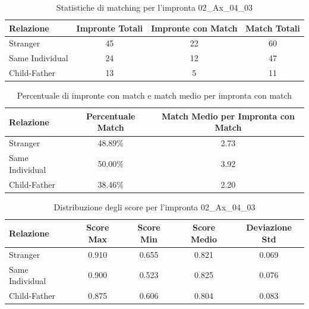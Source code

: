 \begin{table}[htbp]
\centering
\caption{Statistiche di matching per l'impronta 02\_Ax\_04\_03}
\label{tab:results_02_Ax_04_03}
\begin{tabular}{|l|c|c|c|}
\hline
\textbf{Relazione} & \textbf{Impronte Totali} & \textbf{Impronte con Match} & \textbf{Match Totali} \\
\hline
Stranger & 45 & 22 & 60 \\
\hline
Same Individual & 24 & 12 & 47 \\
\hline
Child-Father & 13 & 5 & 11 \\
\hline
\end{tabular}
\end{table}


\begin{table}[htbp]
\centering
\caption{Percentuale di impronte con match e match medio per impronta con match}
\label{tab:match_percentage_02_Ax_04_03}
\begin{tabular}{|l|c|c|}
\hline
\textbf{Relazione} & \textbf{Percentuale Match} & \textbf{Match Medio per Impronta con Match} \\
\hline
Stranger & 48.89\% & 2.73 \\
\hline
Same Individual & 50.00\% & 3.92 \\
\hline
Child-Father & 38.46\% & 2.20 \\
\hline
\end{tabular}
\end{table}


\begin{table}[htbp]
\centering
\caption{Distribuzione degli score per l'impronta 02\_Ax\_04\_03}
\label{tab:scores_02_Ax_04_03}
\begin{tabular}{|l|c|c|c|c|}
\hline
\textbf{Relazione} & \textbf{Score Max} & \textbf{Score Min} & \textbf{Score Medio} & \textbf{Deviazione Std} \\
\hline
Stranger & 0.910 & 0.655 & 0.821 & 0.069 \\
\hline
Same Individual & 0.900 & 0.523 & 0.825 & 0.076 \\
\hline
Child-Father & 0.875 & 0.606 & 0.804 & 0.083 \\
\hline
\end{tabular}
\end{table}

